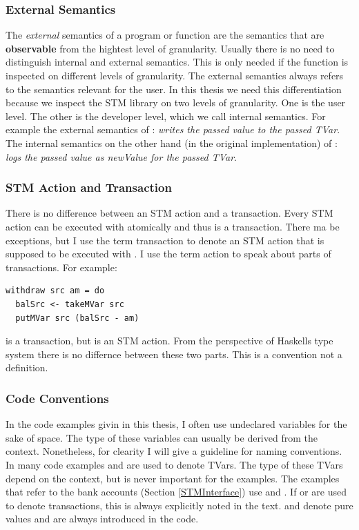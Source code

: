 \subsubsection{External Semantics}
The \textit{external} semantics of a program or function are the semantics that are \textbf{observable} from the 
hightest level of granularity. Usually there
is no need to distinguish internal and external semantics. This is only needed if the function is inspected on 
different levels of granularity. The external semantics always refers to the semantics relevant for the user.
In this thesis we need this differentiation because we inspect the STM library on two levels of granularity. 
One is the user level. The other is the developer level, which we call 
internal semantics. For example the external semantics of :
\textit{writes the passed value to the passed TVar}.
The internal semantics on the other hand (in the original implementation) of :
\textit{logs the passed value as newValue for the passed TVar}.

\subsubsection{STM Action and Transaction}
There is no difference between an STM action and a transaction. Every STM action can be executed with 
atomically and thus is a transaction. There ma be exceptions, but I use the term transaction to denote
an STM action that is supposed to be executed with . I use the term  action
to speak about parts of transactions. For example:
\begin{lstlisting}
withdraw src am = do
  balSrc <- takeMVar src
  putMVar src (balSrc - am)
\end{lstlisting}
 is a transaction, but  is an STM action. From the perspective
of Haskells type system there is no differnce between these two parts. This is a convention not a definition. 

\subsubsection{Code Conventions}
In the code examples givin in this thesis, I often use undeclared variables for the sake of space.
The type of these variables can usually be derived from the context. Nonetheless, for 
clearity I will give a guideline for naming conventions. In many code examples  and  
are used to denote TVars. The type of these TVars depend on the context, but is never important for the
examples. The examples that refer to the bank accounts (Section \ref{STMInterface}) use  and 
. If  or  are used to denote transactions, this is always explicitly 
noted in the text.  and  denote pure values and are always introduced in the code.

